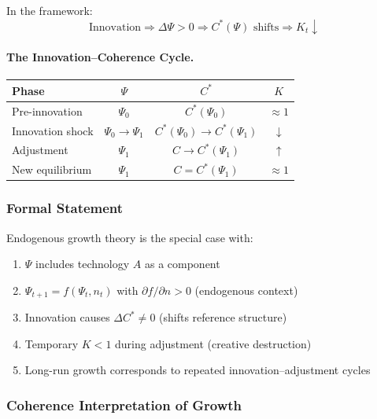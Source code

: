 In the framework:
\begin{equation}
  \text{Innovation} \Rightarrow \Delta \Psi > 0 \Rightarrow C^*(\Psi) \text{ shifts} \Rightarrow K_t \downarrow
\end{equation}

\paragraph{The Innovation--Coherence Cycle.}
\begin{center}
\renewcommand{\arraystretch}{1.2}
\begin{tabular}{lccc}
\hline
\textbf{Phase} & $\Psi$ & $C^*$ & $K$ \\
\hline
Pre-innovation & $\Psi_0$ & $C^*(\Psi_0)$ & $\approx 1$ \\
Innovation shock & $\Psi_0 \to \Psi_1$ & $C^*(\Psi_0) \to C^*(\Psi_1)$ & $\downarrow$ \\
Adjustment & $\Psi_1$ & $C \to C^*(\Psi_1)$ & $\uparrow$ \\
New equilibrium & $\Psi_1$ & $C = C^*(\Psi_1)$ & $\approx 1$ \\
\hline
\end{tabular}
\end{center}

\subsubsection{Formal Statement}

\begin{proposition}
Endogenous growth theory is the special case with:
\begin{enumerate}
  \item $\Psi$ includes technology $A$ as a component
  \item $\Psi_{t+1} = f(\Psi_t, n_t)$ with $\partial f / \partial n > 0$ (endogenous context)
  \item Innovation causes $\Delta C^* \neq 0$ (shifts reference structure)
  \item Temporary $K < 1$ during adjustment (creative destruction)
  \item Long-run growth corresponds to repeated innovation--adjustment cycles
\end{enumerate}
\end{proposition}

\subsubsection{Coherence Interpretation of Growth}

